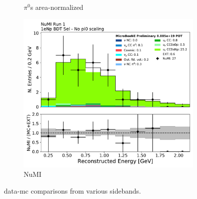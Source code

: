 \begin{figure}[H]
\begin{center}
\begin{subfigure}[b]{0.3\textwidth}
    \caption{\label{fig:datamccomparisons:numu} $\pi^0$s area-normalized}
    \end{subfigure}
    \begin{subfigure}[b]{0.3\textwidth}
    \centering
    \includegraphics[width=1.00\textwidth]{Sidebands/Figures/NuMI/1eNp/BDTSel/reco_e.pdf}
    \caption{\label{fig:datamccomparisons:pi0} NuMI \npsel}
    \end{subfigure}
\caption{\label{fig:datamccomparisons1} data-mc comparisons from various sidebands.}
\end{center}
\end{figure}

